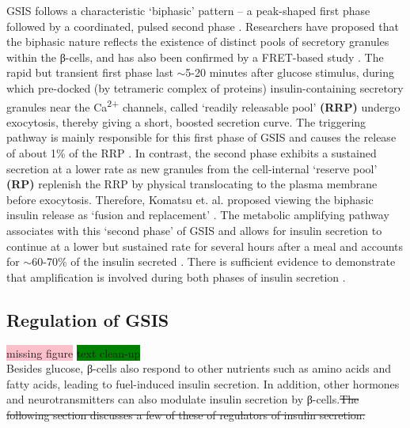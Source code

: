 GSIS follows a characteristic `biphasic' pattern – a peak-shaped first phase followed by a coordinated, pulsed second phase \textbf{\cite{grodsky_threshold_1972,ashcroft_diabetes_2012,komatsu_glucosestimulated_2013}}. Researchers have proposed that the biphasic nature reflects the existence of distinct pools of secretory granules within the β-cells, and has also been confirmed by a FRET-based study \textbf{\cite{ashcroft_diabetes_2012,takahashi_snare_2010}}. The rapid but transient first phase last $\sim$5-20 minutes after glucose stimulus, during which pre-docked (by tetrameric complex of proteins) insulin-containing secretory granules near the Ca\textsuperscript{2+} channels, called `readily releasable pool' \textbf{(RRP)} undergo exocytosis, thereby giving a short, boosted secretion curve. The triggering pathway is mainly responsible for this first phase of GSIS \textbf{\cite{kalwat_mechanisms_2017,campbell_mechanisms_2021}} and causes the release of about 1\% of  the RRP \textbf{\cite{campbell_mechanisms_2021}}. In contrast, the second phase exhibits a sustained secretion at a lower rate as new granules from the cell-internal `reserve pool' \textbf{(RP)} replenish the RRP by physical translocating to the plasma membrane before exocytosis. Therefore, Komatsu et. al. proposed viewing the biphasic insulin release as `fusion and replacement' \textbf{\cite{komatsu_glucosestimulated_2013}}. The metabolic amplifying pathway associates with this `second phase' of GSIS \textbf{\cite{kalwat_mechanisms_2017,campbell_mechanisms_2021}} and allows for insulin secretion to continue at a lower but sustained rate for several hours after a meal and accounts for $\sim$60-70\% of the insulin secreted \textbf{\cite{henquin_regulation_2009}}. There is sufficient evidence to demonstrate that amplification is involved during both phases of insulin secretion \textbf{\cite{mourad_metabolic_2010,mourad_metabolic_2011}}.
\subsection{Regulation of GSIS} %
\label{sec:reggsis}
\colorbox{pink}{missing figure} \colorbox{green}{text clean-up} \\

Besides glucose, β-cells also respond to other nutrients such as amino acids and fatty acids, leading to fuel-induced insulin secretion. In addition, other hormones and neurotransmitters can also modulate insulin secretion by β-cells.\st{The following section discusses a few of these of regulators of insulin secretion:}

